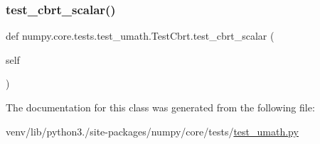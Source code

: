 \subsubsection{\texorpdfstring{test\+\_\+cbrt\+\_\+scalar()}{test\_cbrt\_scalar()}}
{\footnotesize\ttfamily def numpy.\+core.\+tests.\+test\+\_\+umath.\+Test\+Cbrt.\+test\+\_\+cbrt\+\_\+scalar (\begin{DoxyParamCaption}\item[{}]{self }\end{DoxyParamCaption})}



The documentation for this class was generated from the following file\+:\begin{DoxyCompactItemize}
\item 
venv/lib/python3./site-\/packages/numpy/core/tests/\hyperlink{test__umath_8py}{test\+\_\+umath.\+py}\end{DoxyCompactItemize}
